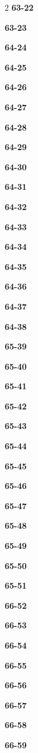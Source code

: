 \documentclass[10pt,a4paper]{article}
\begin{document}
\begin{multicols}{2}
\noindent\textbf{63-22}\ \par
\noindent\textbf{63-23}\ \par
\noindent\textbf{64-24}\ \par
\noindent\textbf{64-25}\ \par
\noindent\textbf{64-26}\ \par
\noindent\textbf{64-27}\ \par
\noindent\textbf{64-28}\ \par
\noindent\textbf{64-29}\ \par
\noindent\textbf{64-30}\ \par
\noindent\textbf{64-31}\ \par
\noindent\textbf{64-32}\ \par
\noindent\textbf{64-33}\ \par
\noindent\textbf{64-34}\ \par
\noindent\textbf{64-35}\ \par
\noindent\textbf{64-36}\ \par
\noindent\textbf{64-37}\ \par
\noindent\textbf{64-38}\ \par
\noindent\textbf{65-39}\ \par
\noindent\textbf{65-40}\ \par
\noindent\textbf{65-41}\ \par
\noindent\textbf{65-42}\ \par
\noindent\textbf{65-43}\ \par
\noindent\textbf{65-44}\ \par
\noindent\textbf{65-45}\ \par
\noindent\textbf{65-46}\ \par
\noindent\textbf{65-47}\ \par
\noindent\textbf{65-48}\ \par
\noindent\textbf{65-49}\ \par
\noindent\textbf{65-50}\ \par
\noindent\textbf{65-51}\ \par
\noindent\textbf{66-52}\ \par
\noindent\textbf{66-53}\ \par
\noindent\textbf{66-54}\ \par
\noindent\textbf{66-55}\ \par
\noindent\textbf{66-56}\ \par
\noindent\textbf{66-57}\ \par
\noindent\textbf{66-58}\ \par
\noindent\textbf{66-59}\ \par

\end{multicols}
\end{document}
